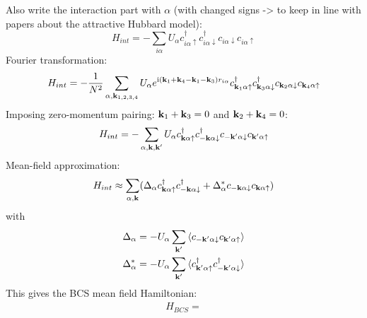 Also write the interaction part with \(\alpha\) (with changed signs -> to keep in line with papers about the attractive Hubbard model):
\begin{equation}
    H_{int} = - \sum_{i \alpha} U_{\alpha} c_{i\alpha \uparrow}^{\dagger} c_{i\alpha \downarrow}^{\dagger} c_{i\alpha \downarrow} c_{i\alpha \uparrow}
\end{equation}
Fourier transformation:
\begin{equation}
    H_{int} = - \frac{1}{N^2} \sum_{\alpha, \bm{\mathrm{k}}_{1, 2, 3, 4}} U_{\alpha} e^{\mathrm{i} (\bm{\mathrm{k}}_1 + \bm{\mathrm{k}}_4 - \bm{\mathrm{k}}_1 - \bm{\mathrm{k}}_3) r_{i \alpha}}  c_{\bm{\mathrm{k}}_1 \alpha \uparrow}^{\dagger} c_{\bm{\mathrm{k}}_3 \alpha \downarrow}^{\dagger} c_{\bm{\mathrm{k}}_2 \alpha \downarrow} c_{\bm{\mathrm{k}}_4 \alpha \uparrow}
\end{equation}
Imposing zero-momentum pairing: \(\bm{\mathrm{k}}_1 + \bm{\mathrm{k}}_3 = 0\) and \(\bm{\mathrm{k}}_2 + \bm{\mathrm{k}}_4 = 0\):
\begin{align}
    H_{int} = - \sum_{\alpha, \bm{\mathrm{k}}, \bm{\mathrm{k}}^{\prime}} U_{\alpha} c_{\bm{\mathrm{k}} \alpha \uparrow}^{\dagger} c_{-\bm{\mathrm{k}} \alpha \downarrow}^{\dagger} c_{-\bm{\mathrm{k}}^{\prime} \alpha \downarrow} c_{\bm{\mathrm{k}}^{\prime} \alpha \uparrow}
\end{align}
Mean-field approximation:
\begin{align}
    H_{int} \approx \sum_{\alpha, \bm{\mathrm{k}}} (\Delta_{\alpha} c_{\bm{\mathrm{k}} \alpha \uparrow}^{\dagger} c_{-\bm{\mathrm{k}} \alpha \downarrow}^{\dagger} + \Delta_{\alpha}^* c_{-\bm{\mathrm{k}} \alpha \downarrow} c_{\bm{\mathrm{k}} \alpha \uparrow})
\end{align}
with
\begin{align}
    \Delta_{\alpha} &= - U_{\alpha} \sum_{\bm{\mathrm{k}}^{\prime}} \braket{c_{-\bm{\mathrm{k}}^{\prime} \alpha \downarrow} c_{\bm{\mathrm{k}}^{\prime} \alpha \uparrow}} \\
    \Delta_{\alpha}^* &= - U_{\alpha} \sum_{\bm{\mathrm{k}}^{\prime}} \braket{c_{\bm{\mathrm{k}}^{\prime} \alpha \uparrow}^{\dagger} c_{-\bm{\mathrm{k}}^{\prime} \alpha \downarrow}^{\dagger}}
\end{align}
This gives the BCS mean field Hamiltonian:
\begin{align}
    H_{BCS} =
\end{align}

